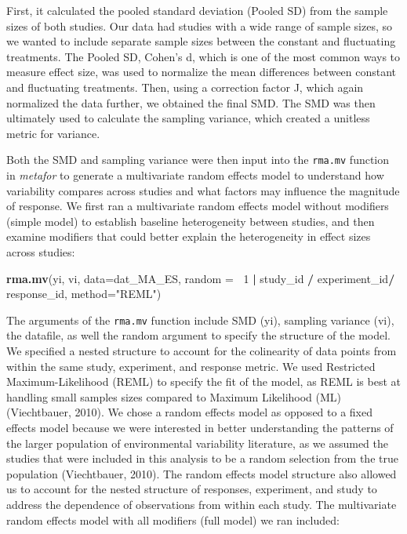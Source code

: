 \documentclass[12pt,twoside]{reedthesis}
\newenvironment{Shaded}{\begin{snugshade}}{\end{snugshade}}
\newcommand{\DataTypeTok}[1]{\textcolor[rgb]{0.13,0.29,0.53}{#1}}
\newcommand{\DecValTok}[1]{\textcolor[rgb]{0.00,0.00,0.81}{#1}}
\newcommand{\KeywordTok}[1]{\textcolor[rgb]{0.13,0.29,0.53}{\textbf{#1}}}
\newcommand{\NormalTok}[1]{#1}
\newcommand{\OperatorTok}[1]{\textcolor[rgb]{0.81,0.36,0.00}{\textbf{#1}}}
\newcommand{\StringTok}[1]{\textcolor[rgb]{0.31,0.60,0.02}{#1}}
\begin{document}
First, it calculated the pooled standard deviation (Pooled SD) from the sample sizes of both studies. Our data had studies with a wide range of sample sizes, so we wanted to include separate sample sizes between the constant and fluctuating treatments. The Pooled SD, Cohen's d, which is one of the most common ways to measure effect size, was used to normalize the mean differences between constant and fluctuating treatments. Then, using a correction factor J, which again normalized the data further, we obtained the final SMD. The SMD was then ultimately used to calculate the sampling variance, which created a unitless metric for variance.

Both the SMD and sampling variance were then input into the \texttt{rma.mv} function in \emph{metafor} to generate a multivariate random effects model to understand how variability compares across studies and what factors may influence the magnitude of response. We first ran a multivariate random effects model without modifiers (simple model) to establish baseline heterogeneity between studies, and then examine modifiers that could better explain the heterogeneity in effect sizes across studies:
\begin{Shaded}
\begin{Highlighting}[]
\KeywordTok{rma.mv}\NormalTok{(yi, vi, }
       \DataTypeTok{data=}\NormalTok{dat_MA_ES, }
       \DataTypeTok{random =} \OperatorTok{~}\DecValTok{1} \OperatorTok{|}\StringTok{ }\NormalTok{study_id }\OperatorTok{/}\StringTok{ }\NormalTok{experiment_id}\OperatorTok{/}\StringTok{ }\NormalTok{response_id, }
       \DataTypeTok{method=}\StringTok{"REML"}\NormalTok{) }
\end{Highlighting}
\end{Shaded}
The arguments of the \texttt{rma.mv} function include SMD (yi), sampling variance (vi), the datafile, as well the random argument to specify the structure of the model. We specified a nested structure to account for the colinearity of data points from within the same study, experiment, and response metric. We used Restricted Maximum-Likelihood (REML) to specify the fit of the model, as REML is best at handling small samples sizes compared to Maximum Likelihood (ML) (Viechtbauer, 2010). We chose a random effects model as opposed to a fixed effects model because we were interested in better understanding the patterns of the larger population of environmental variability literature, as we assumed the studies that were included in this analysis to be a random selection from the true population (Viechtbauer, 2010). The random effects model structure also allowed us to account for the nested structure of responses, experiment, and study to address the dependence of observations from within each study. The multivariate random effects model with all modifiers (full model) we ran included:
\end{document}
